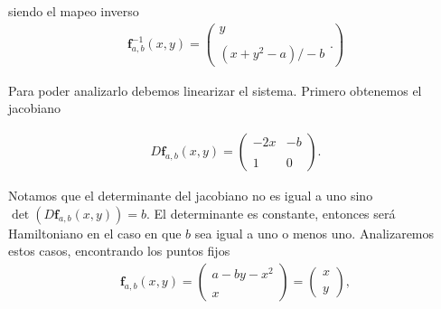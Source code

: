 siendo el mapeo inverso
\begin{eqnarray}
\mathbf{f}^{-1}_{a,b}(x,y)=\left( \begin{array}{lcc}
             y\\
             \\ (x+y^{2}-a)/-b
             \end{array}.
             \right) \label{HenonI}
\end{eqnarray} 

       
Para poder analizarlo debemos linearizar el sistema. Primero obtenemos el jacobiano 
            
\begin{eqnarray}
D\mathbf{f}_{a,b}(x,y)= \left( \begin{array}{lcc}
                -2x & -b\\
                \\ 1 & 0
                \end{array}
                \right).
\end{eqnarray}

                
Notamos que el determinante del jacobiano no es igual a uno sino $\det(D\mathbf{f}_{a,b}(x,y))=b$.
El determinante es constante, entonces será Hamiltoniano en el caso en que $b$ sea igual a uno o menos uno. Analizaremos estos casos, encontrando los puntos fijos
\begin{eqnarray}
\mathbf{f}_{a,b}(x,y)=\left( \begin{array}{lcc}
               a-by-x^{2}\\
               \\ x
               \end{array}
               \right) = \left(\begin{array}{lc}
               x \\
               \\ y
               \end{array}
               \right),
\end{eqnarray}
              
